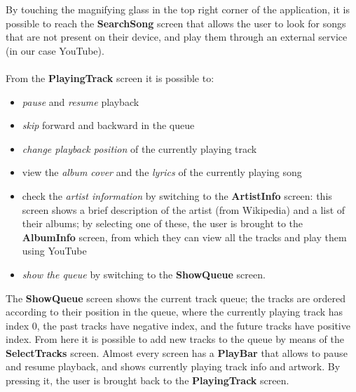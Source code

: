 \documentclass{article}
\begin{document}
By touching the magnifying glass in the top right corner of the application, it
is possible to reach the \textbf{SearchSong} screen that allows the user to look
for songs that are not present on their device, and play them through an
external service (in our case YouTube).
\\\\
From the \textbf{PlayingTrack} screen it is possible to:
\begin{itemize}
    \item \textit{pause} and \textit{resume} playback
    \item \textit{skip} forward and backward in the queue
    \item \textit{change playback position} of the currently playing track
    \item view the \textit{album cover} and the \textit{lyrics} of the currently
        playing song
    \item check the \textit{artist information} by switching to the
        \textbf{ArtistInfo} screen: this screen shows a brief description of the
        artist (from Wikipedia) and a list of their albums; by selecting one of
        these, the user is brought to the \textbf{AlbumInfo} screen, from which 
        they can view all the tracks and play them using YouTube
    \item \textit{show the queue} by switching to the \textbf{ShowQueue} screen.

\end{itemize}

The \textbf{ShowQueue} screen shows the current track queue; the tracks are
ordered according to their position in the queue, where the currently playing
track has index 0, the past tracks have negative index, and the future tracks
have positive index. From here it is possible to add new tracks to the queue by
means of the \textbf{SelectTracks} screen. Almost every screen has a
\textbf{PlayBar} that allows to pause and resume playback, and shows currently
playing track info and artwork. By pressing it, the user is brought back to the
\textbf{PlayingTrack} screen.
\end{document}
